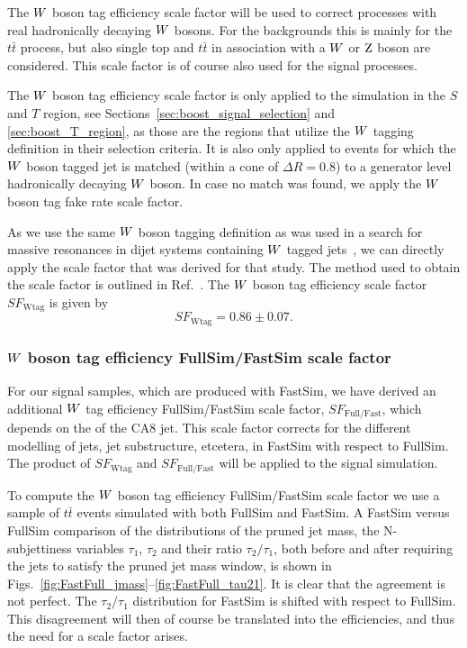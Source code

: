 The $W$ boson tag efficiency scale factor will be used to correct processes with real
hadronically decaying $W$ bosons. For the backgrounds this is mainly for the $t\bar{t}$ process,
but also single top and $t\bar{t}$ in association with a $W$ or $\mathrm{Z}$ boson are considered. This
scale factor is of course also used for the signal processes. 

The $W$ boson tag efficiency scale factor is only applied to the simulation in the $S$ and $T$
region, see Sections~\ref{sec:boost_signal_selection} and \ref{sec:boost_T_region}, as those are the
regions that utilize the $W$ tagging definition in their selection criteria. It is also only
applied to events for which the $W$ boson tagged jet is matched (within a cone of $\Delta R = 0.8$)
to a generator level hadronically decaying $W$ boson. In case no match was found, we apply the $W$
boson tag fake rate scale factor. 

As we use the same $W$ boson tagging definition as was used in a search for massive resonances in
dijet systems containing $W$ tagged jets~\cite{EXO-12-024}, we can directly apply the scale
factor that was derived for that study. The
method used to obtain the scale factor is outlined in Ref.~\cite{CMS-PAS-JME-13-006}. 
The $W$ boson tag efficiency scale factor $SF_{\textrm{Wtag}}$ is given by
\begin{equation}
SF_{\textrm{Wtag}} = 0.86 \pm 0.07 .
\end{equation}



\subsubsection{\texorpdfstring{$W$}{W} boson tag efficiency FullSim/FastSim scale factor
\label{sec:wtag_eff_fastfull_sf}}

For our signal samples, which are produced with FastSim, we have derived an additional $W$ tag
efficiency FullSim/FastSim scale factor, $SF_{\textrm{Full/Fast}}$, which depends on the \pt
of the CA8 jet. This scale factor corrects for the different modelling of jets, jet
substructure, etcetera, in FastSim with respect to FullSim. The product of $SF_{\textrm{Wtag}}$ and
$SF_{\textrm{Full/Fast}}$ will be applied to the signal simulation. 

To compute the $W$ boson tag efficiency FullSim/FastSim scale factor we use a sample of $t\bar{t}$
events simulated with both FullSim and FastSim. 
A FastSim versus FullSim comparison of the distributions of the pruned jet mass, the N-subjettiness
variables $\tau_1$, $\tau_2$ and their ratio $\tau_2/\tau_1$, both before and after requiring the
jets to satisfy the pruned jet mass window, is shown in
Figs.~\ref{fig:FastFull_jmass}--\ref{fig:FastFull_tau21}. It is clear that the agreement is not
perfect. The $\tau_2/\tau_1$ distribution for FastSim is shifted with respect to FullSim. This
disagreement will then of course be translated into the efficiencies, and thus the need for a scale
factor arises. 

